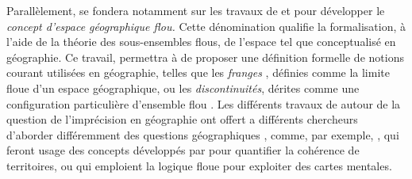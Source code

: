 Parallèlement, \textcite{Rolland-May1984,Rolland-May1987} se fondera
notamment sur les travaux de  et  pour développer
le \emph{concept d’espace géographique flou.} Cette dénomination
qualifie la formalisation, à l’aide de la théorie des sous-ensembles
flous, de l’espace tel que conceptualisé en géographie. Ce travail,
permettra à  de proposer une définition formelle de
notions courant utilisées en géographie, telles que les \emph{franges}
\autocite{Rolland-May1987}, définies comme la limite floue d’un espace
géographique, ou les \emph{discontinuités}, dérites comme une
configuration particulière d’ensemble flou
\autocite{Rolland-May2003}. Les différents travaux de
 autour de la question de l’imprécision en géographie
ont offert a différents chercheurs d’aborder différemment des
questions géographiques \autocite{Dutozia2014}, comme, par exemple,
\textcite{deRuffray2004}, qui feront usage des concepts développés par
 pour quantifier la cohérence de territoires, ou
\textcite{Didelon2013} qui emploient la logique floue pour exploiter
des cartes mentales.












